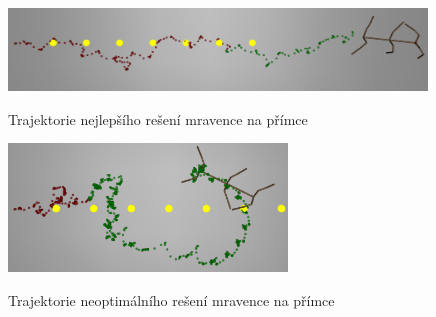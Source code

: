 \begin{figure}[h]
    \centering
    {\includegraphics[width=30em]{obrazky/mravenec_primka_zhora_nejlepsi_reseni_trajektorie.png}}
    \caption{
    Trajektorie nejlepšího rešení mravence na přímce
    }
    \label{fig:mravenec_primka_zhora_nejlepsi_reseni_trajektorie}
\end{figure}

\begin{figure}[h]
    \centering
    {\includegraphics[width=20em]{obrazky/mravenec_zhora_neoptimalni_reseni_trajektorie.png}}
    \caption{
    Trajektorie neoptimálního rešení mravence na přímce
    }
    \label{fig:mravenec_primka_zhora_neoptimalni_reseni_trajektorie}
\end{figure}


